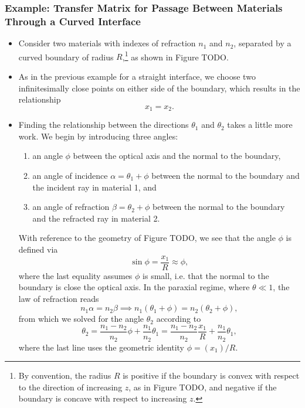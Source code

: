 \documentclass[11pt, a4paper]{article}
\begin{document}
\subsubsection{Example: Transfer Matrix for Passage Between Materials Through a Curved Interface} \label{sss:M-curved-boundary}
\begin{itemize}
    \item Consider two materials with indexes of refraction $ n_{1} $ and $ n_{2} $, separated by a curved boundary of radius $ R $,\footnote{By convention, the radius $ R $ is positive if the boundary is convex with respect to the direction of increasing $ z $, as in Figure TODO, and negative if the boundary is concave with respect to increasing $ z $.} as shown in Figure TODO.

    \item As in the previous example for a straight interface, we choose two infinitesimally close points on either side of the boundary, which results in the relationship
    \begin{equation*}
        x_{1} = x_{2}.
    \end{equation*}

    \item Finding the relationship between the directions $ \theta_{1} $ and $ \theta_{2} $ takes a little more work. We begin by introducing three angles:
    \begin{enumerate}
        \item an angle $ \phi $ between the optical axis and the normal to the boundary,

        \item an angle of incidence $ \alpha = \theta_{1} + \phi $ between the normal to the boundary and the incident ray in material 1, and

        \item an angle of refraction $ \beta = \theta_{2} + \phi $ between the normal to the boundary and the refracted ray in material 2.
    \end{enumerate}
    With reference to the geometry of Figure TODO, we see that the angle $ \phi $ is defined via
    \begin{equation*}
        \sin \phi = \frac{x_{1}}{R} \approx \phi,
    \end{equation*}
    where the last equality assumes $ \phi $ is small, i.e. that the normal to the boundary is close the optical axis. In the paraxial regime, where $ \theta \ll 1 $, the law of refraction reads
    \begin{equation*}
        n_{1} \alpha = n_{2} \beta \implies n_{1} (\theta_{1} + \phi) = n_{2}(\theta_{2} + \phi),
    \end{equation*}
    from which we solved for the angle $ \theta_{2} $ according to
    \begin{equation*}
        \theta_{2} = \frac{n_{1} - n_{2}}{n_{2}} \phi + \frac{n_{1}}{n_{2}} \theta_{1} = \frac{n_{1} - n_{2}}{n_{2}} \frac{x_{1}}{R} + \frac{n_{1}}{n_{2}} \theta_{1},
    \end{equation*}
    where the last line uses the geometric identity $ \phi = (x_{1})/R $.


\end{itemize}
\end{document}

